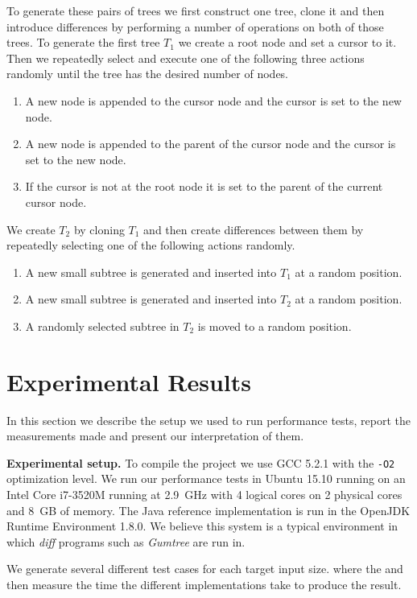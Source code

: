 \documentclass[letterpaper]{article}
\newcommand{\mypar}[1]{{\bf #1.}}
\begin{document}
To generate these pairs of trees we first construct one tree, clone it and then introduce differences by performing a number of operations on both of those trees.
To generate the first tree $T_1$ we create a root node and set a cursor to it.
Then we repeatedly select and execute one of the following three actions randomly until the tree has the desired number of nodes.
\begin{enumerate}
	\item A new node is appended to the cursor node and the cursor is set to the new node.
	\item A new node is appended to the parent of the cursor node and the cursor is set to the new node.
	\item If the cursor is not at the root node it is set to the parent of the current cursor node.
\end{enumerate}
We create $T_2$ by cloning $T_1$ and then create differences between them by repeatedly selecting one of the following actions randomly.
\begin{enumerate}
	\item A new small subtree is generated and inserted into $T_1$ at a random position.
	\item A new small subtree is generated and inserted into $T_2$ at a random position.
	\item A randomly selected subtree in $T_2$ is moved to a random position.
\end{enumerate}

\section{Experimental Results}\label{sec:exp}

In this section we describe the setup we used to run performance tests, report the measurements made and present our interpretation of them.

\mypar{Experimental setup}
To compile the project we use GCC 5.2.1 with the \texttt{-O2} optimization level.
We run our performance tests in Ubuntu 15.10 running on an Intel Core i7-3520M running at 2.9~GHz with 4 logical cores on 2 physical cores and 8~GB of memory.
The Java reference implementation is run in the OpenJDK Runtime Environment 1.8.0.
We believe this system is a typical environment in which \emph{diff} programs such as \emph{Gumtree} are run in.

We generate several different test cases for each target input size. where the  and then measure the time the different implementations take to produce the result.
\end{document}
